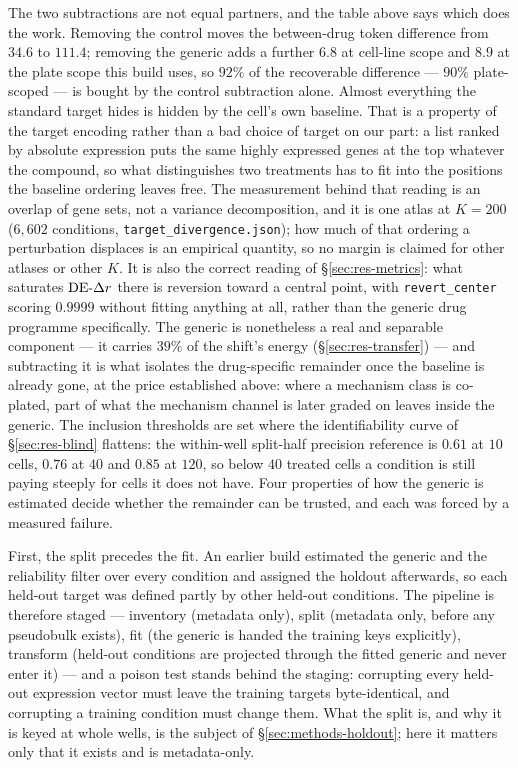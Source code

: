 The two subtractions are not equal partners, and the table above says which does the work. Removing
the control moves the between-drug token difference from $34.6$ to $111.4$; removing the generic
adds a further $6.8$ at cell-line scope and $8.9$ at the plate scope this build uses, so $92\%$ of
the recoverable difference --- $90\%$ plate-scoped --- is bought by the control subtraction alone. Almost everything the standard target hides is hidden by the cell's own baseline. That is a
property of the target encoding rather than a bad choice of target on our part: a list ranked by
absolute expression puts the same highly expressed genes at the top whatever the compound, so what
distinguishes two treatments has to fit into the positions the baseline ordering leaves free. The
measurement behind that reading is an overlap of gene sets, not a variance decomposition, and it is
one atlas at $K = 200$ ($6{,}602$ conditions, \texttt{target\_divergence.json}); how much of that ordering
a perturbation displaces is an empirical quantity, so no margin is claimed for other atlases or
other $K$. It is also the correct reading of \S\ref{sec:res-metrics}: what saturates $\textrm{DE-}\Delta r$
there is reversion toward a central point, with \texttt{revert\_center} scoring $0.9999$ without
fitting anything at all, rather than the generic drug programme specifically. The generic is
nonetheless a real and separable component --- it carries $39\%$ of the shift's energy
(\S\ref{sec:res-transfer}) --- and subtracting it is what isolates the drug-specific remainder once
the baseline is already gone, at the price established above: where a mechanism class is co-plated,
part of what the mechanism channel is later graded on leaves inside the generic. The inclusion thresholds are
set where the identifiability curve of \S\ref{sec:res-blind} flattens: the within-well split-half precision reference is
$0.61$ at $10$ cells, $0.76$ at $40$ and $0.85$ at $120$, so below $40$ treated cells a condition is
still paying steeply for cells it does not have. Four properties of how the generic is estimated
decide whether the remainder can be trusted, and each was forced by a measured failure.

First, the split precedes the fit. An earlier build estimated the generic and the reliability filter
over every condition and assigned the holdout afterwards, so each held-out target was defined partly
by other held-out conditions. The pipeline is therefore staged --- inventory (metadata only), split
(metadata only, before any pseudobulk exists), fit (the generic is handed the training keys
explicitly), transform (held-out conditions are projected through the fitted generic and never enter
it) --- and a poison test stands behind the staging: corrupting every held-out expression vector
must leave the training targets byte-identical, and corrupting a training condition must change
them. What the split is, and why it is keyed at whole wells, is the subject of
\S\ref{sec:methods-holdout}; here it matters only that it exists and is metadata-only.


